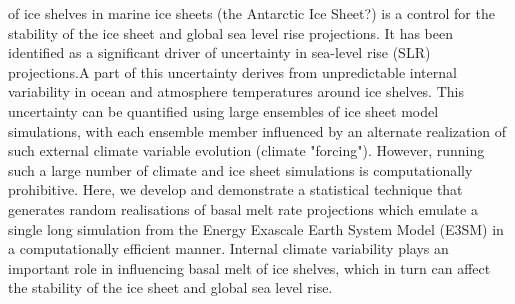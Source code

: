  of ice shelves in marine ice sheets (the Antarctic Ice Sheet?) is a control for the stability of the ice sheet and global sea level rise projections. It has been identified as a significant driver of uncertainty in sea-level rise (SLR) projections.A part of this uncertainty derives from unpredictable internal variability in ocean and atmosphere temperatures around ice shelves. This uncertainty can be quantified using large ensembles of ice sheet model simulations, with each ensemble member influenced by an alternate realization of such external climate variable evolution (climate "forcing"). However, running such a large number of climate and ice sheet simulations is computationally prohibitive. Here, we develop and demonstrate a statistical technique that generates random realisations of basal melt rate projections which emulate a single long simulation from the Energy Exascale Earth System Model (E3SM) in a computationally efficient manner. Internal climate variability plays an important role in influencing  basal melt of ice shelves, which in turn can affect the stability of the ice sheet and global sea level rise.